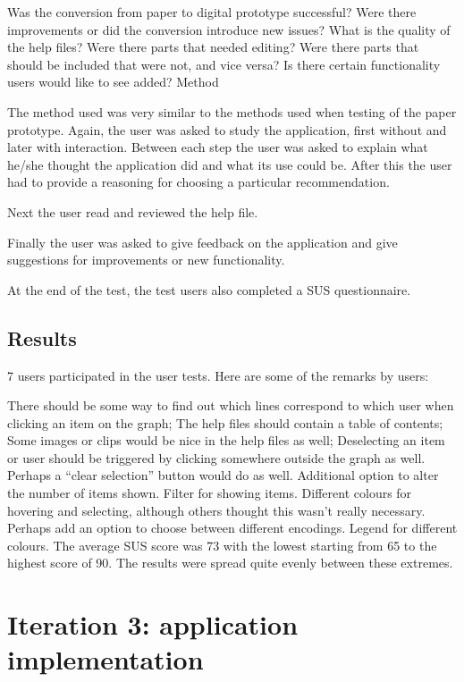 Was the conversion from paper to digital prototype successful? Were there improvements or did the conversion introduce new issues?
What is the quality of the help files? Were there parts that needed editing? Were there parts that should be included that were not, and vice versa?
Is there certain functionality users would like to see added?
Method

The method used was very similar to the methods used when testing of the paper prototype. Again, the user was asked to study the application, first without and later with interaction. Between each step the user was asked to explain what he/she thought the application did and what its use could be. After this the user had to provide a reasoning for choosing a particular recommendation.

Next the user read and reviewed the help file.

Finally the user was asked to give feedback on the application and give suggestions for improvements or new functionality.

At the end of the test, the test users also completed a SUS questionnaire.

\subsection{Results}

7 users participated in the user tests. Here are some of the remarks by users:

There should be some way to find out which lines correspond to which user when clicking an item on the graph;
The help files should contain a table of contents;
Some images or clips would be nice in the help files as well;
Deselecting an item or user should be triggered by clicking somewhere outside the graph as well. Perhaps a “clear selection” button would do as well.
Additional option to alter the number of items shown.
Filter for showing items.
Different colours for hovering and selecting, although others thought this wasn’t really necessary. Perhaps add an option to choose between different encodings.
Legend for different colours.
The average SUS score was 73 with the lowest starting from 65 to the highest score of 90. The results were spread quite evenly between these extremes.




\section{Iteration 3: application implementation}\label{chapter:prototype:section:implementation}









